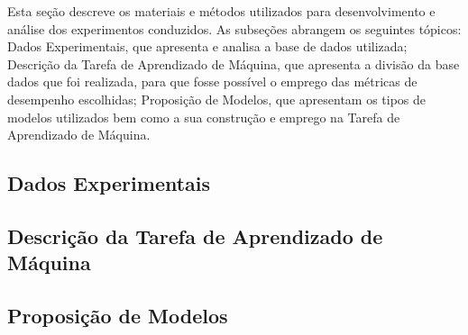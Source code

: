 Esta seção descreve os materiais e métodos utilizados para desenvolvimento e análise dos experimentos conduzidos. As subseções abrangem os seguintes tópicos: Dados Experimentais, que apresenta e analisa a base de dados utilizada; Descrição da Tarefa de Aprendizado de Máquina, que apresenta a divisão da base dados que foi realizada, para que fosse possível o emprego das métricas de desempenho escolhidas; Proposição de Modelos, que apresentam os tipos de modelos utilizados bem como a sua construção e emprego na Tarefa de Aprendizado de Máquina.

\subsection{Dados Experimentais}


\subsection{Descrição da Tarefa de Aprendizado de Máquina}


\subsection{Proposição de Modelos}

